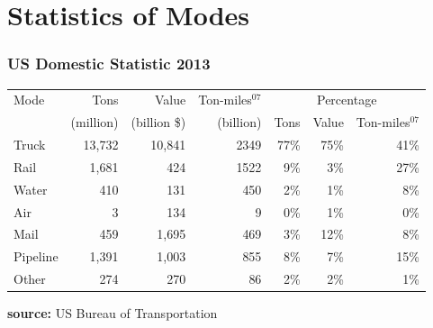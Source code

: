 \documentclass[10pt,presentation]{beamer}
\begin{document}
\section[Mode 101]{Statistics of Modes}

\begin{frame}
  \frametitle{US Domestic Statistic 2013}
  \small{
  \begin{tabular}{lrrr|rrr} \hline		
    Mode               & Tons      & Value    & Ton-miles$^{07}$ & \multicolumn{3}{|c}{Percentage} \\
                       & (million) & (billion \$)& (billion) & Tons  & Value  &Ton-miles$^{07}$ \\ \hline
    Truck	             &13,732	 &10,841	&2349	&77\% &75\% 	&41\% \\
    Rail	             &1,681	   &424	    &1522	&9\% 	&3\% 	&27\% \\
    Water	             &410	     &131	    &450	&2\% 	&1\% 	&8\% \\
    Air	               &3	       &134	    &9	  &0\% 	&1\% 	&0\%  \\
    Mail               &459 &1,695	  &469	&3\% 	&12\% 	&8\% \\
    Pipeline	         &1,391	   &1,003	  &855	&8\% 	&7\% 	&15\% \\
    Other              &274	     &270	    &86	  &2\% 	&2\% 	&1\% \\ \hline
  \end{tabular}
  }



  \begin{flushright}
    \tiny{\textbf{source:} US Bureau of Transportation}
  \end{flushright}


\end{frame}
\end{document}
